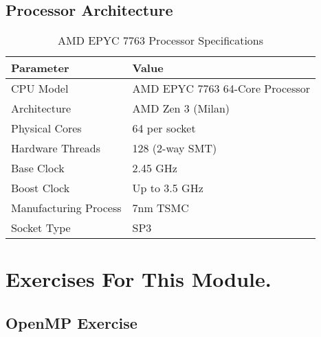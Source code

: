 \documentclass[11pt]{article}
\begin{document}
\subsection{Processor Architecture}

\begin{table}[H]
\centering
\caption{AMD EPYC 7763 Processor Specifications}
\label{tab:processor_specs}
\begin{tabular}{@{}ll@{}}
\hline
\textbf{Parameter} & \textbf{Value} \\
\hline
CPU Model & AMD EPYC 7763 64-Core Processor \\
Architecture & AMD Zen 3 (Milan) \\
Physical Cores & 64 per socket \\
Hardware Threads & 128 (2-way SMT) \\
Base Clock & 2.45 GHz \\
Boost Clock & Up to 3.5 GHz \\
Manufacturing Process & 7nm TSMC \\
Socket Type & SP3 \\
\hline
\end{tabular}
\end{table}



\section{Exercises For This Module.}



\subsection{OpenMP Exercise}
\end{document}
